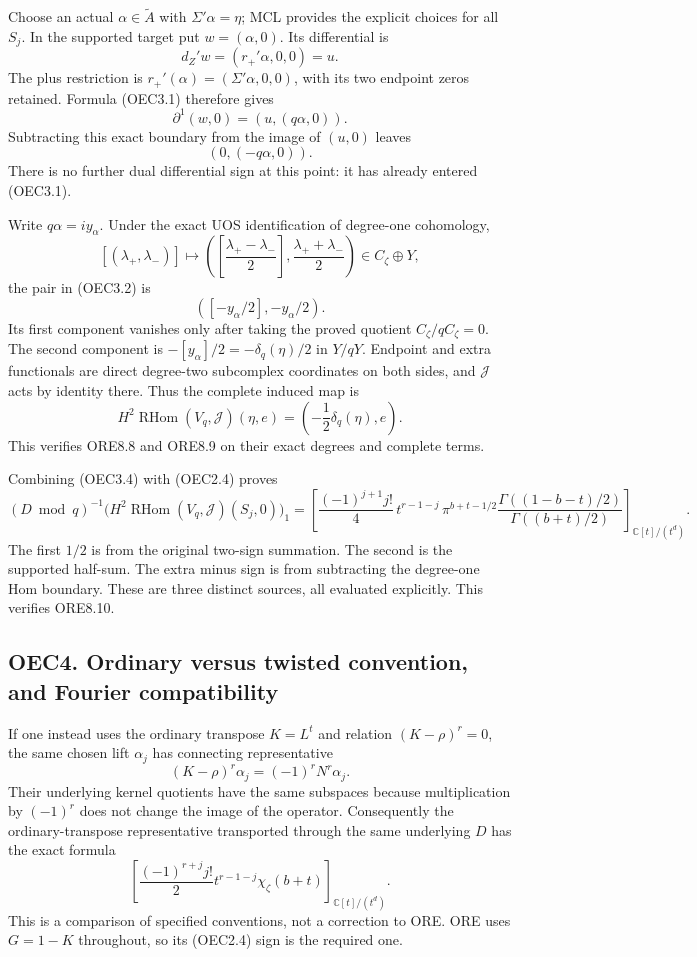 Choose an actual \(\alpha\in\widetilde A\) with \(\Sigma'\alpha=\eta\);
MCL provides the explicit choices for all \(S_j\). In the supported
target put \(w=(\alpha,0)\). Its differential is \[
 d_Z'w=(r_+'\alpha,0,0)=u.
\] The plus restriction is \(r_+'(\alpha)=(\Sigma'\alpha,0,0)\), with
its two endpoint zeros retained. Formula (OEC3.1) therefore gives \[
 \partial^1(w,0)=(u,(q\alpha,0)).
\] Subtracting this exact boundary from the image of \((u,0)\) leaves \[
 \boxed{(0,(-q\alpha,0)).}
 \tag{OEC3.2}
\] There is no further dual differential sign at this point: it has
already entered (OEC3.1).

Write \(q\alpha=iy_\alpha\). Under the exact UOS identification of
degree-one cohomology, \[
 [(\lambda_+,\lambda_-)]
 \longmapsto
 \left(\left[\frac{\lambda_+-\lambda_-}{2}\right],
             \frac{\lambda_++\lambda_-}{2}\right)
 \in C_\zeta\oplus Y,
\] the pair in (OEC3.2) is \[
 \left([-y_\alpha/2],-y_\alpha/2\right).
 \tag{OEC3.3}
\] Its first component vanishes only after taking the proved quotient
\(C_\zeta/qC_\zeta=0\). The second component is
\(-[y_\alpha]/2=-\delta_q(\eta)/2\) in \(Y/qY\). Endpoint and extra
functionals are direct degree-two subcomplex coordinates on both sides,
and \(\mathcal J\) acts by identity there. Thus the complete induced map
is \[
 \boxed{
 H^2\operatorname{RHom}(V_q,\mathcal J)(\eta,e)
 =\left(-\frac12\delta_q(\eta),e\right).
 }
 \tag{OEC3.4}
\] This verifies ORE8.8 and ORE8.9 on their exact degrees and complete
terms.

Combining (OEC3.4) with (OEC2.4) proves \[
 \boxed{
 (D\bmod q)^{-1}
 \big(H^2\operatorname{RHom}(V_q,\mathcal J)(S_j,0)\big)_1
 =
 \left[
 \frac{(-1)^{j+1}j!}{4}\,
 t^{r-1-j}\,
 \pi^{b+t-1/2}
 \frac{\Gamma((1-b-t)/2)}{\Gamma((b+t)/2)}
 \right]_{\mathbb C[t]/(t^d)} .
 }
 \tag{OEC3.5}
\] The first \(1/2\) is from the original two-sign summation. The second
is the supported half-sum. The extra minus sign is from subtracting the
degree-one Hom boundary. These are three distinct sources, all evaluated
explicitly. This verifies ORE8.10.

\subsection{OEC4. Ordinary versus twisted convention, and Fourier
compatibility}\label{oec4.-ordinary-versus-twisted-convention-and-fourier-compatibility}

If one instead uses the ordinary transpose \(K=L^t\) and relation
\((K-\rho)^r=0\), the same chosen lift \(\alpha_j\) has connecting
representative \[
 (K-\rho)^r\alpha_j=(-1)^rN^r\alpha_j.
\] Their underlying kernel quotients have the same subspaces because
multiplication by \((-1)^r\) does not change the image of the operator.
Consequently the ordinary-transpose representative transported through
the same underlying \(D\) has the exact formula \[
 \left[
 \frac{(-1)^{r+j}j!}{2}
 t^{r-1-j}\chi_\zeta(b+t)
 \right]_{\mathbb C[t]/(t^d)} .
 \tag{OEC4.1}
\] This is a comparison of specified conventions, not a correction to
ORE. ORE uses \(G=1-K\) throughout, so its (OEC2.4) sign is the required
one.

